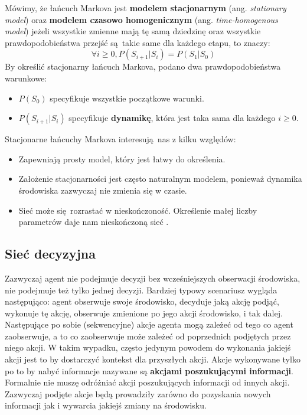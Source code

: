 \documentclass[a4paper, 12pt,oneside]{book}
\begin{document}
Mówimy, że łańcuch Markova jest \textbf{modelem stacjonarnym} (ang.
\textit{stationary model}) oraz \textbf{modelem czasowo homogenicznym } (ang.
\textit{time-homogenous model}) jeżeli wszystkie zmienne mają tę samą dziedzinę
oraz wszystkie prawdopodobieństwa przejść są takie same dla każdego etapu, to
znaczy:
\[\forall i \ge 0, P(S_{i+1}|S_i) = P(S_1|S_0)\]
By określić stacjonarny łańcuch Markova, podano dwa prawdopodobieństwa
warunkowe:
\begin{itemize}
		\setlength\itemsep{-0.4em}
	\item $P(S_0)$ specyfikuje wszystkie początkowe warunki.
	\item $P(S_{i+1} | S_i)$ specyfikuje \textbf{dynamikę}, która jest taka
		sama dla każdego $i \ge 0$.
\end{itemize}
Stacjonarne łańcuchy Markova interesują nas z kilku względów:
\begin{itemize}
		\setlength\itemsep{-0.4em}
	\item Zapewniają prosty model, który jest łatwy do określenia.
	\item Założenie stacjonarności jest często naturalnym modelem, ponieważ
		dynamika środowiska zazwyczaj nie zmienia się w czasie.
	\item Sieć może się rozrastać w nieskończoność. Określenie małej liczby
		parametrów daje nam nieskończoną
		sieć \cite{ai_foundations_markov_chains}.
\end{itemize}

\subsection{Sieć decyzyjna}
Zazwyczaj agent nie podejmuje decyzji bez wcześniejszych obserwacji środowiska,
nie podejmuje też tylko jednej decyzji. Bardziej typowy scenariusz wygląda
następująco: agent obserwuje swoje środowisko, decyduje jaką akcję podjąć,
wykonuje tę akcję, obserwuje zmienione po jego akcji środowisko, i tak dalej.
Następujące po sobie (sekwencyjne) akcje agenta mogą zależeć od tego co agent
zaobserwuje, a to co zaobserwuje może zależeć od poprzednich podjętych przez
niego akcji. W takim wypadku, często jedynym powodem do wykonania jakiejś
akcji jest to by dostarczyć kontekst dla przyszłych akcji. Akcje wykonywane
tylko po to by nabyć informacje nazywane są \textbf{akcjami poszukującymi
informacji}. Formalnie nie muszę odróżniać akcji poszukujących informacji od
innych akcji. Zazwyczaj podjęte akcje będą prowadziły zarówno do pozyskania
nowych informacji jak i wywarcia jakiejś zmiany na środowisku.
\end{document}
